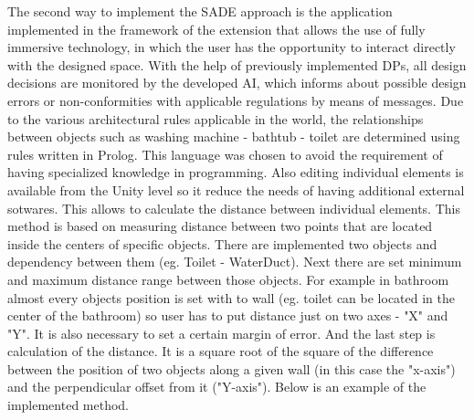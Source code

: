 \documentclass[runningheads]{llncs}
\begin{document}
The second way to implement the SADE approach is the application implemented in the framework of the extension that allows the use of fully immersive technology, in which the user has the opportunity to interact directly with the designed space. With the help of previously implemented DPs, all design decisions are monitored by the developed AI, which informs about possible design errors or non-conformities with applicable regulations by means of messages.
Due to the various architectural rules applicable in the world, the relationships between objects such as washing machine - bathtub - toilet are determined using rules written in Prolog. This language was chosen to avoid the requirement of having specialized knowledge in programming. Also editing individual elements is available from the Unity level so it reduce the needs of having additional external sotwares. This allows to calculate the distance between individual elements. This method is based on measuring distance between two points that are located inside the centers of specific objects. There are implemented two objects and dependency between them (eg. Toilet - WaterDuct). Next there are set minimum and maximum distance range between those objects. For example in bathroom almost every objects position is set with to wall (eg. toilet can be located in the center of the bathroom) so user has to put distance just on two axes - "X" and "Y". It is also necessary to set a certain margin of error. And the last step is calculation of the distance. It is a square root of the square of the difference between the position of two objects along a given wall (in this case the "x-axis") and the perpendicular offset from it ("Y-axis"). Below is an example of the implemented method. 

\begin{lstlisting}[language={c++}, caption={Prolog example}, label={Script}]
\end{lstlisting}
\end{document}
